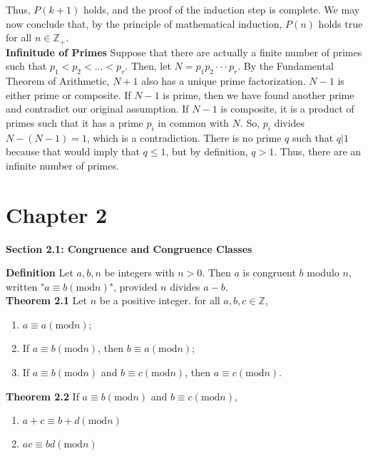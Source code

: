 \documentclass[12pt]{article}
\newcommand{\Z}{\mathbb{Z}}
\begin{document}
\noindent
Thus, $P(k+1)$ holds, and the proof of the induction step is complete. We may now conclude that, by the principle of mathematical induction, $P(n)$ holds true for all $n \in \Z_+$. \\

\noindent
\textbf{Infinitude of Primes} Suppose that there are actually a finite number of primes such that $p_1<p_2<...<p_r$. Then, let $N=p_1p_2 \cdot \cdot \cdot p_r$. By the Fundamental Theorem of Arithmetic, $N+1$ also has a unique prime factorization. $N-1$ is either prime or composite. If $N-1$ is prime, then we have found another prime and contradict our original assumption. If $N-1$ is composite, it is a product of primes such that it has a prime $p_i$ in common with $N$. So, $p_i$ divides $N-(N-1)=1$, which is a contradiction. There is no prime $q$ such that $q|1$ because that would imply that $q \leq 1$, but by definition, $q>1$. Thus, there are an infinite number of primes. \qedsymbol

\section*{Chapter 2}

\begin{center}
\textbf{Section 2.1: Congruence and Congruence Classes} \\
\end{center}

\noindent
\textbf{Definition} Let $a,b,n$ be integers with $n>0$. Then $a$ is congruent $b$ modulo $n$, written "$a \equiv b (\text{mod}n)$", provided $n$ divides $a-b$. \\

\noindent
\textbf{Theorem 2.1} Let $n$ be a positive integer. for all $a,b,c \in \Z$,
\begin{enumerate}
\item $a \equiv a (\text{mod}n)$;
\item If $a \equiv b (\text{mod}n)$, then $b \equiv a (\text{mod}n)$;
\item If $a \equiv b (\text{mod}n)$ and $b \equiv c (\text{mod}n)$, then $a \equiv c (\text{mod}n)$.
\end{enumerate}

\noindent
\textbf{Theorem 2.2} If $a \equiv b (\text{mod}n)$ and $b \equiv c (\text{mod}n)$,
\begin{enumerate}
\item $a + c \equiv b + d(\text{mod}n)$
\item $ac \equiv bd (\text{mod}n)$
\end{enumerate}
\end{document}
